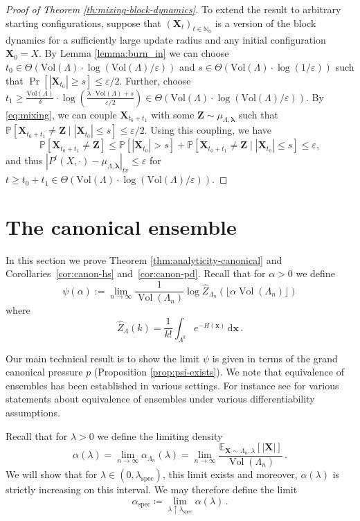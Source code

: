 \documentclass[10pt]{amsart}
\theoremstyle{definition}
\theoremstyle{remark}
\newcommand{\spec}{{\mathrm{spec}}}
\newcommand{\bX}{\mathbf{X}}
\newcommand{\bZ}{\mathbf{Z}}
\newcommand{\Vol}{\operatorname{Vol}}
\renewcommand{\P}{\mathbb{P}}
\newcommand{\E}{\mathbb{E}}
\newcommand{\N}{\mathbb{N}}
\newcommand{\region}{\Lambda}
\newcommand{\activity}{\lambda}
\newcommand{\activities}{\pmb{\lambda}}
\newcommand{\size}[1]{\left\lvert#1\right\rvert}
\newcommand{\diff}{\mathrm{d}}
\newcommand{\vol}{\mathrm{Vol}}
\newcommand{\absolute}[1]{\left\lvert#1\right\rvert}
\begin{document}
\begin{proof}[Proof of Theorem \ref{th:mixing-block-dynamics}]
		To extend the result to arbitrary starting configurations, suppose that $(\bX_t)_{t \in \N_0}$ is a version of the block dynamics for a sufficiently large update radius and any initial configuration $\bX_0 = X$.
		By Lemma \ref{lemma:burn_in} we can choose $t_0 \in \Theta(\vol(\region) \cdot \log(\vol(\region)/\varepsilon))$ and $s \in \Theta(\vol(\region) \cdot \log(1/\varepsilon))$ such that $\Pr[\size{\bX_{t_0}} \ge s ] \le \varepsilon/2$.
		Further, choose $t_1 \ge \frac{\vol(\region)}{\delta} \cdot \log\left(\frac{\activity \cdot \vol(\region) + s}{\varepsilon/2}\right) \in \Theta(\vol(\region) \cdot \log(\vol(\region)/\varepsilon))$.
		By \eqref{eq:mixing}, we can couple $\bX_{t_0 + t_1}$ with some $\bZ \sim \mu_{\region, \activities}$ such that $\P[\bX_{t_0 + t_1} \neq \bZ \mid \size{\bX_{t_0}} \le s] \le \varepsilon/2$.
		Using this coupling, we have
		\[
		\P[\bX_{t_0 + t_1} \neq \bZ] \le \P[\size{\bX_{t_0}} > s] + \P[\bX_{t_0 + t_1} \neq \bZ \mid \size{\bX_{t_0}} \le s] \le \varepsilon,
		\]
		and thus $\absolute{P^t(X, \cdot) - \mu_{\region, \activities}}_{tv} \le \varepsilon$ for $t \ge t_0 + t_1 \in \Theta(\vol(\region) \cdot \log(\vol(\region)/\varepsilon))$.
	\end{proof}
	
	
	\section{The canonical ensemble}\label{sec:canonical-ensemble}
	In this section we prove Theorem \ref{thm:analyticity-canonical} and Corollaries~\ref{cor:canon-hs} and~\ref{cor:canon-pd}. 
	Recall that for $\alpha > 0$ we define   
	$$\psi(\alpha) := \lim_{n \to \infty} \frac{1}{\Vol(\Lambda_n)}\log \widehat{Z}_{\Lambda_n}(\lfloor \alpha \Vol(\Lambda_n)\rfloor ) 
	$$
	where 
	$$\widehat{Z}_{\Lambda}(k) = \frac{1}{k!} \int_{\Lambda^{k}} e^{-H(\mathbf{x})}\,\diff \mathbf{x}\,.$$
	
	Our main technical result is to show the limit $\psi$ is given in terms of the grand canonical pressure $p$ (Proposition \ref{prop:psi-exists}). We note that equivalence of ensembles has been established in various settings.  For instance see \cite[Theorem~3.4]{ruelle1969statistical} for various statements about equivalence of ensembles under various differentiability assumptions. 
	
	Recall that for $\lambda>0$ we define the limiting density
	$$\alpha(\lambda)= \lim_{n \to \infty} \alpha_{\Lambda_n}(\lambda)
	=\lim_{n\to\infty}
	\frac{\E_{\bX \sim \Lambda_n,\lambda}[|\bX|]}{\Vol(\Lambda_n)}\, .
	$$
	We will show that for $\lambda\in (0,\lambda_\spec)$, this limit exists and moreover, $\alpha(\lambda)$ is strictly increasing on this interval. We may therefore define the limit
	\[
	\alpha_{\spec}
	\coloneqq
	\lim_{\lambda\uparrow\lambda_{\spec}}\alpha(\lambda)\, .
	\]
	
\end{document}

